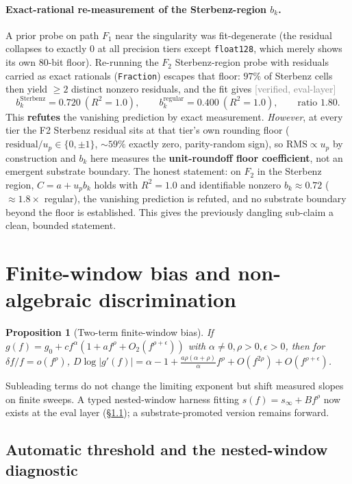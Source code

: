 \documentclass[11pt,a4paper]{article}
\newtheorem{proposition}{Proposition}
\newcommand{\status}[1]{\textcolor{gray}{\small\textsf{[#1]}}}
\begin{document}
\paragraph{Exact-rational re-measurement of the Sterbenz-region $b_k$.} A prior probe on path $F_1$ near the singularity was fit-degenerate (the residual collapses to exactly $0$ at all precision tiers except \texttt{float128}, which merely shows its own 80-bit floor). Re-running the $F_2$ Sterbenz-region probe with residuals carried as exact rationals (\texttt{Fraction}) escapes that floor: $97\%$ of Sterbenz cells then yield $\ge2$ distinct nonzero residuals, and the fit gives \status{verified, eval-layer}
\[
b_k^{\text{Sterbenz}}=0.720\ (R^2{=}1.0),\qquad b_k^{\text{regular}}=0.400\ (R^2{=}1.0),\qquad \text{ratio }1.80.
\]
This \textbf{refutes} the vanishing prediction by exact measurement. \emph{However}, at every tier the F2 Sterbenz residual sits at that tier's own rounding floor ($\text{residual}/u_p\in\{0,\pm1\}$, $\sim59\%$ exactly zero, parity-random sign), so $\text{RMS}\propto u_p$ by construction and $b_k$ here measures the \textbf{unit-roundoff floor coefficient}, not an emergent substrate boundary. The honest statement: on $F_2$ in the Sterbenz region, $C=a+u_p b_k$ holds with $R^2=1.0$ and identifiable nonzero $b_k\approx0.72$ ($\approx1.8\times$ regular), the vanishing prediction is refuted, and no substrate boundary beyond the floor is established. This gives the previously dangling sub-claim a clean, bounded statement.

\section{Finite-window bias and non-algebraic discrimination}\label{sec:finite-window}

\begin{proposition}[Two-term finite-window bias]\label{prop:bias}
If $g(f)=g_0+c f^\alpha(1+a f^\rho+O_2(f^{\rho+\epsilon}))$ with $\alpha\ne0,\rho>0,\epsilon>0$, then for $\delta f/f=o(f^\rho)$,
$D\log|g'(f)|=\alpha-1+\frac{a\rho(\alpha+\rho)}{\alpha}f^\rho+O(f^{2\rho})+O(f^{\rho+\epsilon})$.
\end{proposition}
Subleading terms do not change the limiting exponent but shift measured slopes on finite sweeps. A typed nested-window harness fitting $s(f)=s_\infty+Bf^\rho$ now exists at the eval layer (\S\ref{sec:nested}); a substrate-promoted version remains forward.

\subsection{Automatic threshold and the nested-window diagnostic}\label{sec:nested}
\end{document}
